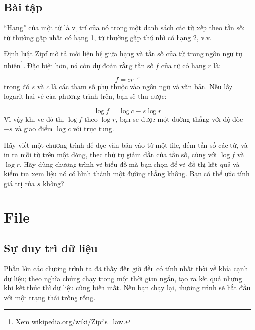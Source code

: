 \documentclass[11pt]{book}
\begin{document}
\section{Bài tập}

\begin{ex}


``Hạng'' của một từ là vị trí của nó trong một danh sách các từ
xếp theo tần số: từ thường gặp nhất có hạng 1, từ thường gặp thứ nhì
có hạng 2, v.v.

Định luật Zipf mô tả mối liện hệ giữa hạng và tần số của từ trong
ngôn ngữ tự nhiên\footnote{Xem
  \url{wikipedia.org/wiki/Zipf's_law}.}. Đặc biệt hơn, nó còn 
dự đoán  rằng tần số $f$ của từ có hạng $r$ là:

\[ f = c r^{-s} \]
%
trong đó $s$ và $c$ là các tham số phụ thuộc vào ngôn ngữ và
văn bản. Nếu lấy logarit hai vế của phương trình trên, bạn sẽ
thu được:


\[ \log f = \log c - s \log r \]
%
Vì vậy khi vẽ đồ thị $\log f$ theo $\log r$, bạn sẽ được một
đường thẳng với độ dốc $-s$ và giao điểm $\log c$ với trục tung.

Hãy viết một chương trình để đọc văn bản vào từ một file, đếm 
tần số các từ, và in ra mỗi từ trên một dòng, theo thứ tự giảm dần
của tần số, cùng với
$\log f$ và $\log r$. Hãy dùng chương trình vẽ biểu đồ mà bạn chọn
để vẽ đồ thị kết quả và kiểm tra xem liệu nó có hình thành một
đường thẳng không. Bạn có thể ước tính giá trị của $s$ không?
\end{ex}


\chapter{File}



\section{Sự duy trì dữ liệu}


Phần lớn các chương trình ta đã thấy đến giờ đều có tính nhất
thời về khía cạnh dữ liệu; theo nghĩa chúng chạy trong một
thời gian ngắn, tạo ra kết quả nhưng khi kết thúc thì dữ liệu
cũng biến mất. Nếu bạn chạy lại, chương trình sẽ bắt đầu
với một trạng thái trống rỗng.
\end{document}
